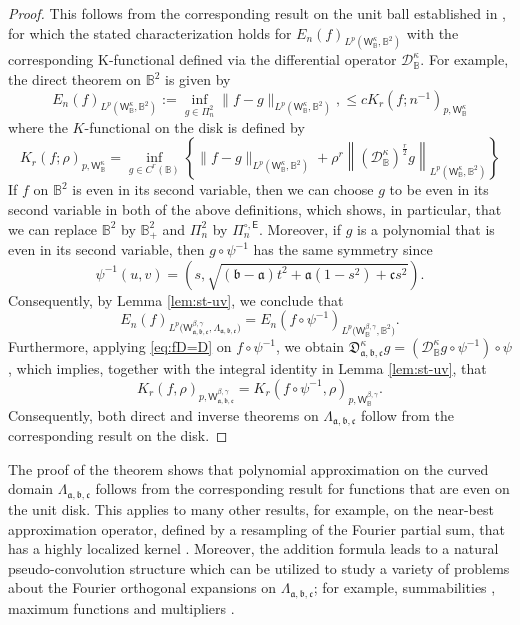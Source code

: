 \documentclass{amsart}
\theoremstyle{remark}
\def\sE{{\mathsf E}}
\def\sW{{\mathsf W}}
\def\fa{{\mathfrak a}}
\def\fb{{\mathfrak b}}
\def\fc{{\mathfrak c}}
\def\fD{{\mathfrak D}}
\def\b{{\beta}}
\def\g{{\gamma}}
\def\k{{\kappa}}
\def\CD{{\mathcal D}}
\def\BB{{\mathbb B}}
\begin{document}
\begin{proof}
This follows from the corresponding result on the unit ball established in \cite[Theorem 4.3]{X05}, for which the 
stated characterization holds for $E_n(f)_{L^p(\sW_\BB^\k, \BB^2)}$ with the corresponding K-functional defined via
the differential operator $\CD_\BB^\k$. For example, the direct theorem on $\BB^2$ is given by
$$
  E_n(f)_{L^p(\sW_\BB^\k,\BB^2)}:= \inf_{g \in\Pi_n^2} \|f - g\|_{L^p(\sW_\BB^\k,\BB^2)},
   \le c K_r(f; n^{-1})_{p, \sW_\BB^\k}
$$
where the $K$-functional on the disk is defined by 
$$
   K_r(f; \rho)_{p, \sW_\BB^\k} = \inf_{g\in C^r(\BB)} \left \{ \|f-g\|_{L^p(\sW_\BB^\k,\BB^2)} + 
       \rho^r \left \| (\CD_\BB^\k)^\frac r 2  g\right\|_{L^p(\sW_\BB^\k,\BB^2)} \right\}
$$
If $f$ on $\BB^2$ is even in its second variable, then we can choose $g$ to be even in its second variable in both 
of the above definitions, which shows, in particular, that we can replace $\BB^2$ by $\BB_+^2$ and $\Pi_n^2$ by
$\Pi_n^{\circ, \sE}$. Moreover, if $g$ is a polynomial that is even in its second variable, then $g\circ \psi^{-1}$ has 
the same symmetry since 
\begin{equation*} %
       \psi^{-1}(u,v) = \left(s, \sqrt{(\fb-\fa)t^2 + \fa(1-s^2) + \fc s^2}\right). 
\end{equation*}
Consequently, by Lemma \ref{lem:st-uv}, we conclude that 
$$
  E_n(f)_{L^p\big(\sW_{\fa, \fb, \fc}^{\b,\g},\Lambda_{\fa, \fb, \fc}\big)} 
     = E_n\left( f\circ \psi^{-1} \right)_{L^p\big(\sW_\BB^{\b,\g},\BB^2\big)}.
$$
Furthermore, applying \eqref{eq:fD=D} on $f\circ \psi^{-1}$, we obtain 
$\fD_{\fa,\fb,\fc}^\k g = \left(\CD_\BB^\k g\circ \psi^{-1} \right) \circ \psi$, which implies, together with the integral
identity in Lemma \ref{lem:st-uv}, that 
$$
   K_r(f, \rho)_{p,\sW_{\fa, \fb, \fc}^{\b,\g}} 
       = K_r\left( f\circ \psi^{-1}, \rho \right)_{p,\sW_\BB^{\b,\g}}.
$$
Consequently, both direct and inverse theorems on $\Lambda_{\fa, \fb, \fc}$ follow from the corresponding result
on the disk. 
\end{proof}
 
The proof of the theorem shows that polynomial approximation on the curved domain $\Lambda_{\fa, \fb, \fc}$
follows from the corresponding result for functions that are even on the unit disk. This applies to many other 
results, for example, on the near-best approximation operator, defined by a resampling of the Fourier partial sum,
that has a highly localized kernel \cite{DaiX, X21}. Moreover, the addition formula leads to a natural 
pseudo-convolution structure which can be utilized to study a variety of problems about the Fourier orthogonal 
expansions on $\Lambda_{\fa, \fb, \fc}$; for example, summabilities \cite{X21}, maximum functions and 
multipliers \cite{X22}.  
 
\end{document}
